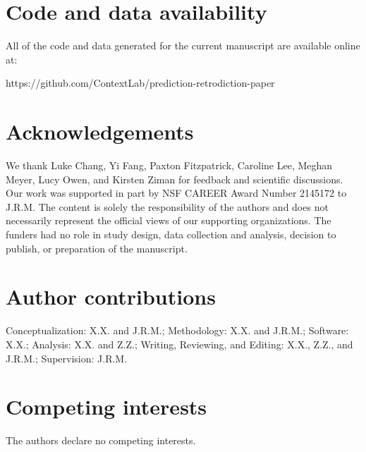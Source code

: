 \documentclass[10pt]{article}
\providecommand{\DIFaddbegin}{} %
\providecommand{\DIFaddend}{} %
\providecommand{\DIFdelbegin}{} %
\providecommand{\DIFdelend}{} %
\newcommand{\DIFscaledelfig}{0.5}
\newlength{\DIFdelgraphicswidth} %
\newlength{\DIFdelgraphicsheight} %
\newcommand{\DIFaddincludegraphics}[2][]{{\color{blue}\fbox{\DIFOincludegraphics[#1]{#2}}}} %
\newcommand{\DIFdelincludegraphics}[2][]{%
\sbox{\DIFdelgraphicsbox}{\DIFOincludegraphics[#1]{#2}}%
\settoboxwidth{\DIFdelgraphicswidth}{\DIFdelgraphicsbox} %
\settoboxtotalheight{\DIFdelgraphicsheight}{\DIFdelgraphicsbox} %
\scalebox{\DIFscaledelfig}{%
\parbox[b]{\DIFdelgraphicswidth}{\usebox{\DIFdelgraphicsbox}\\[-\baselineskip] \rule{\DIFdelgraphicswidth}{0em}}\llap{\resizebox{\DIFdelgraphicswidth}{\DIFdelgraphicsheight}{%
\setlength{\unitlength}{\DIFdelgraphicswidth}%
\begin{picture}(1,1)%
\thicklines\linethickness{2pt} %
{\color[rgb]{1,0,0}\put(0,0){\framebox(1,1){}}}%
{\color[rgb]{1,0,0}\put(0,0){\line( 1,1){1}}}%
{\color[rgb]{1,0,0}\put(0,1){\line(1,-1){1}}}%
\end{picture}%
}\hspace*{3pt}}} %
} %
\DeclareRobustCommand{\DIFaddbegin}{\DIFOaddbegin \let\includegraphics\DIFaddincludegraphics} %
\DeclareRobustCommand{\DIFaddend}{\DIFOaddend \let\includegraphics\DIFOincludegraphics} %
\DeclareRobustCommand{\DIFdelbegin}{\DIFOdelbegin \let\includegraphics\DIFdelincludegraphics} %
\DeclareRobustCommand{\DIFdelend}{\DIFOaddend \let\includegraphics\DIFOincludegraphics} %
\begin{document}
\section*{Code and data availability}
All of the code and data generated for the current manuscript are available online at:

https://github.com/ContextLab/prediction-retrodiction-paper

% 
\DIFdelbegin %
\DIFdelend \DIFaddbegin 
\DIFaddend 

\section*{Acknowledgements}
We thank Luke Chang, Yi Fang, Paxton Fitzpatrick, Caroline Lee, Meghan Meyer, Lucy Owen, and Kirsten Ziman for feedback and scientific discussions.  Our work was supported in part by NSF CAREER Award Number 2145172 to J.R.M. The content is solely the responsibility of the authors and does not necessarily represent the official views of our supporting organizations.  The funders had no role in study design, data collection and analysis, decision to publish, or preparation of the manuscript.

\section*{Author contributions}
Conceptualization: X.X. and J.R.M.; Methodology: X.X. and J.R.M.; Software: X.X.; Analysis: X.X. and Z.Z.; Writing, Reviewing, and Editing: X.X., Z.Z., and J.R.M.; Supervision: J.R.M.

\section*{Competing interests}
The authors declare no competing interests.
\end{document}

